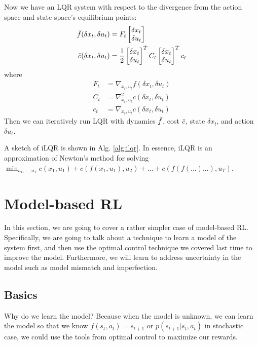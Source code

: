 Now we have an LQR system with respect to the divergence from the action space and state space's equilibrium points:
\begin{align*}
    \Bar{f}(\delta x_t, \delta u_t) &= F_t \begin{bmatrix}\delta x_t\\\delta u_t\end{bmatrix}\\
    \Bar{c}(\delta x_t, \delta u_t) &= \frac{1}{2}\begin{bmatrix}\delta x_t\\\delta u_t\end{bmatrix}^TC_t\begin{bmatrix}\delta x_t\\\delta u_t\end{bmatrix}^Tc_t
\end{align*}
where 
\begin{align*}
    F_t &= \nabla_{x_t,u_t}f(\delta x_t, \delta u_t) \\
    C_t &= \nabla^2_{x_t,u_t}c(\delta x_t, \delta u_t)\\
    c_t &= \nabla_{x_t,u_t}c(\delta x_t, \delta u_t)
\end{align*}
Then we can iteratively run LQR with dynamics $\Bar{f}$, cost $\Bar{c}$, state $\delta x_t$, and action $\delta u_t$.


A sketch of iLQR is shown in Alg. \ref{alg:ilqr}. In essence, iLQR is an approximation of Newton's method for solving $\min_{u_1,...,u_T}c(x_1,u_1) + c(f(x_1,u_1),u_2)+...+c(f(f(...)...),u_T)$.

\section{Model-based RL}
In this section, we are going to cover a rather simpler case of model-based RL. Specifically, we are going to talk about a technique to learn a model of the system first, and then use the optimal control technique we covered last time to improve the model. Furthermore, we will learn to address uncertainty in the model such as model mismatch and imperfection.
\subsection{Basics}
Why do we learn the model? Because when the model is unknown, we can learn the model so that we know $f(s_t,a_t) = s_{t+1}$ or $p(s_{t+1}|s_t,a_t)$ in stochastic case, we could use the tools from optimal control to maximize our rewards. 


